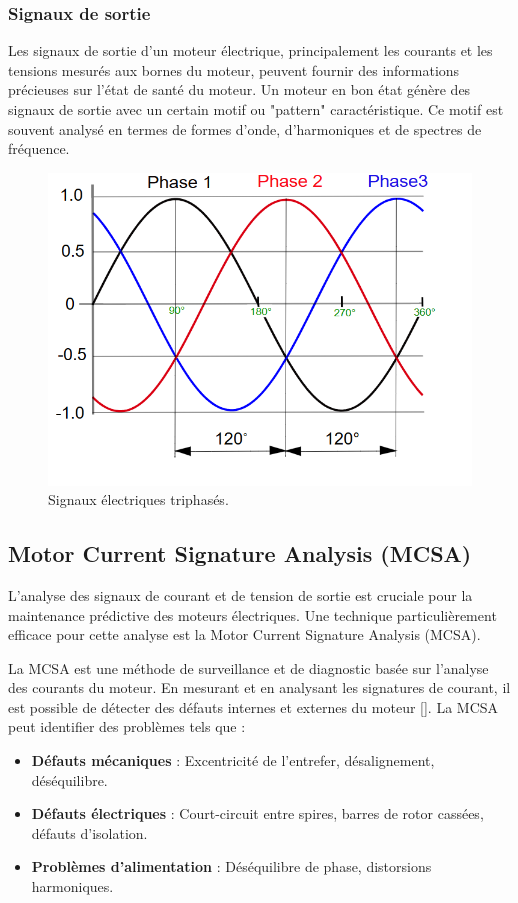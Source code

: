 \subsubsection*{Signaux de sortie}

Les signaux de sortie d'un moteur électrique, principalement les courants et
les tensions mesurés aux bornes du moteur, peuvent fournir des informations
précieuses sur l'état de santé du moteur. Un moteur en bon état génère des
signaux de sortie avec un certain motif ou "pattern" caractéristique. Ce motif
est souvent analysé en termes de formes d'onde, d'harmoniques et de spectres de
fréquence.

\begin{figure}[hbt!]
	\centering
	\includegraphics[width=12cm]{images_pfe/triphase.png}
	\caption{
		Signaux électriques triphasés.}
	\label{fig:moteur-asynchrone-tri}
\end{figure}
\FloatBarrier

\subsection{Motor Current Signature Analysis (MCSA)}

L'analyse des signaux de courant et de tension de sortie est cruciale pour la
maintenance prédictive des moteurs électriques. Une technique particulièrement
efficace pour cette analyse est la Motor Current Signature Analysis (MCSA).

La MCSA est une méthode de surveillance et de diagnostic basée sur l'analyse
des courants du moteur. En mesurant et en analysant les signatures de courant,
il est possible de détecter des défauts internes et externes du moteur
	[\cite{bonetjara2023sensorless}]. La MCSA peut identifier des problèmes tels
que :
\begin{itemize}
	\item \textbf{Défauts mécaniques} : Excentricité de l'entrefer, désalignement, déséquilibre.
	\item \textbf{Défauts électriques} : Court-circuit entre spires, barres de rotor cassées, défauts d'isolation.
	\item \textbf{Problèmes d'alimentation} : Déséquilibre de phase, distorsions harmoniques.
\end{itemize}

